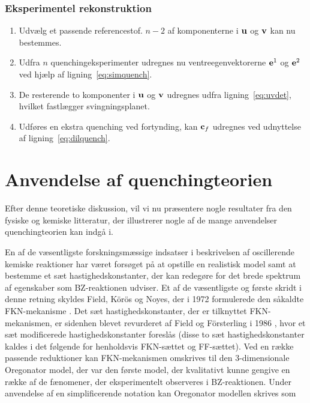 \subsubsection{Eksperimentel rekonstruktion}
\begin{itemize}
\begin{enumerate}
 \item Udv{\ae}lg et passende referencestof. $n-2$ af komponenterne
       i ${\bf u}$ og ${\bf v}$ kan nu bestemmes.
 \item Udfra $n$ quenchingeksperimenter udregnes nu 
       ventreegenvektorerne ${\bf e}^1$ og ${\bf e}^2$ 
       ved hj{\ae}lp af lig\-ning~\ref{eq:simquench}.
 \item De resterende to komponenter i ${\bf u}$ og ${\bf v}$
       udregnes udfra lig\-ning~\ref{eq:uvdet}, hvilket 
       fastl{\ae}gger sving\-ningsplanet.
 \item Udf{\o}res en ekstra quenching ved fortynding, 
       kan ${\bf c}_f$ udregnes ved udnyttelse af 
       lig\-ning~\ref{eq:dilquench}.
\end{enumerate}
\end{itemize}

\section{Anvendelse af quenchingteorien}
Efter denne teoretiske diskussion, vil vi nu pr{\ae}sentere
nogle resultater fra den fysiske og kemiske litteratur, der
illustrerer nogle af de mange anvendelser quenchingteorien
kan indg{\aa} i.

\vspace{4.0mm}
En af de v{\ae}sentligste forskningsm{\ae}ssige indsatser i
beskrivelsen af oscillerende kemiske reaktioner har
v{\ae}ret fors{\o}get p{\aa} at opstille en realistisk
model samt at bestemme et s{\ae}t hastighedskonstanter, der
kan redeg{\o}re for det brede spektrum af egenskaber som
BZ-reaktionen udviser. Et af de v{\ae}sentligste og
f{\o}rste skridt i denne retning skyldes Field,
K\"{o}r\"{o}s og Noyes, der i 1972 formulerede den
s{\aa}kaldte FKN-mekanisme \cite{FKNorig}. Det s{\ae}t
hastighedskonstanter, der er tilknyttet FKN-mekanismen, er
sidenhen blevet revurderet af Field og F\"{o}rsterling i
1986 \cite{ffrate}, hvor et s{\ae}t modificerede
hastighedskonstanter foresl{\aa}s (disse to s{\ae}t
hastighedskonstanter kaldes i det f{\o}lgende for
henholdsvis FKN-s{\ae}ttet og FF-s{\ae}ttet). Ved en
r{\ae}kke passende reduktioner kan FKN-mekanismen omskrives
til den 3-dimensionale Oregonator model, der var den
f{\o}rste model, der kvalitativt kunne gengive en r{\ae}kke
af de f{\ae}nomener, der eksperimentelt observeres i
BZ-reaktionen. Under anvendelse af en simplificerende
notation kan Oregonator model\-len skrives som
 
